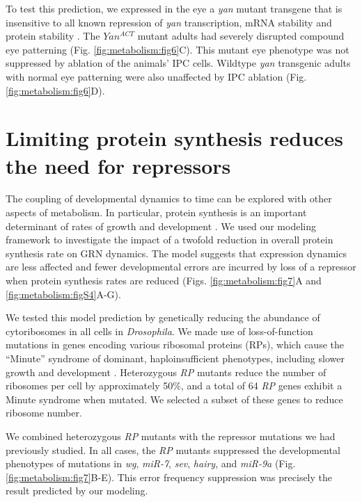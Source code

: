 To test this prediction, we expressed in the eye a \textit{yan} mutant transgene that is insensitive to all known repression of \textit{yan} transcription, mRNA stability and protein stability \cite{Rebay1995}. The $Yan^{ACT}$ mutant adults had severely disrupted compound eye patterning (Fig. \ref{fig:metabolism:fig6}C). This mutant eye phenotype was not suppressed by ablation of the animals' IPC cells. Wildtype \textit{yan} transgenic adults with normal eye patterning were also unaffected by IPC ablation (Fig. \ref{fig:metabolism:fig6}D).

\section{Limiting protein synthesis reduces the need for repressors}

The coupling of developmental dynamics to time can be explored with other aspects of metabolism. In particular, protein synthesis is an important determinant of rates of growth and development \cite{Lempiainen2009}. We used our modeling framework to investigate the impact of a twofold reduction in overall protein synthesis rate on GRN dynamics. The model suggests that expression dynamics are less affected and fewer developmental errors are incurred by loss of a repressor when protein synthesis rates are reduced (Figs. \ref{fig:metabolism:fig7}A and \ref{fig:metabolism:figS4}A-G).

We tested this model prediction by genetically reducing the abundance of cytoribosomes in all cells in \textit{Drosophila}. We made use of loss-of-function mutations in genes encoding various ribosomal proteins (RPs), which cause the ``Minute'' syndrome of dominant, haploinsufficient phenotypes, including slower growth and development \cite{Marygold2007,Sæbøelarssen1998}. Heterozygous \textit{RP} mutants reduce the number of ribosomes per cell by approximately 50\%, and a total of 64 \textit{RP} genes exhibit a Minute syndrome when mutated. We selected a subset of these genes to reduce ribosome number.

We combined heterozygous \textit{RP} mutants with the repressor mutations we had previously studied. In all cases, the \textit{RP} mutants suppressed the developmental phenotypes of mutations in \textit{wg}, \textit{miR-7}, \textit{sev}, \textit{hairy}, and \textit{miR-9a} (Fig. \ref{fig:metabolism:fig7}B-E). This error frequency suppression was precisely the result predicted by our modeling.

